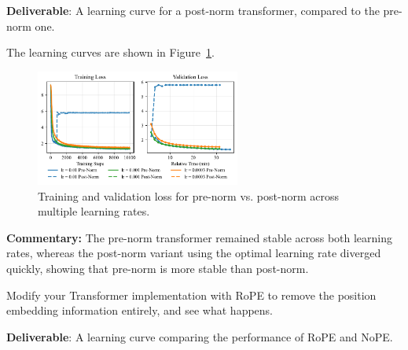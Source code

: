 \textbf{Deliverable}: A learning curve for a post-norm transformer, compared to the pre-norm one.

\begin{answer}

The learning curves are shown in Figure~\ref{fig:prenorm_ablation}.

\begin{figure}[!htb]
    \centering
    \includegraphics[width=0.6\textwidth]{images/prenorm_ablation_experiments.pdf}
    \caption{Training and validation loss for pre-norm vs. post-norm across multiple learning rates.}
    \label{fig:prenorm_ablation}
\end{figure}

\textbf{Commentary:} The pre-norm transformer remained stable across both learning rates, whereas the post-norm variant using the optimal learning rate diverged quickly, showing that pre-norm is more stable than post-norm.
\end{answer}


Modify your Transformer implementation with RoPE to remove the position embedding information entirely, and see what happens.

\textbf{Deliverable}: A learning curve comparing the performance of RoPE and NoPE.

